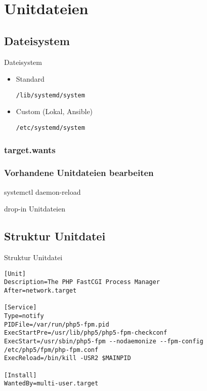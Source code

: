\section{Unitdateien}

\subsection{Dateisystem}

\begin{frame}[fragile]{Dateisystem}
  \begin{itemize}
\item Standard

	\verb|/lib/systemd/system|
\item Custom (Lokal, Ansible)

	\verb|/etc/systemd/system|
\end{itemize}
\end{frame}

\subsubsection{target.wants}

\subsubsection{Vorhandene Unitdateien bearbeiten}


 systemctl daemon-reload

 drop-in Unitdateien
 \subsection{Struktur Unitdatei}

\begin{frame}[fragile]{Struktur Unitdatei}
 \begin{lstlisting}
[Unit]
Description=The PHP FastCGI Process Manager
After=network.target

[Service]
Type=notify
PIDFile=/var/run/php5-fpm.pid
ExecStartPre=/usr/lib/php5/php5-fpm-checkconf
ExecStart=/usr/sbin/php5-fpm --nodaemonize --fpm-config /etc/php5/fpm/php-fpm.conf
ExecReload=/bin/kill -USR2 $MAINPID

[Install]
WantedBy=multi-user.target
\end{lstlisting}
\end{frame}

